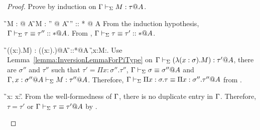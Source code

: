 \begin{proof}
    Prove by induction on \( \Gamma \vdash_\Sigma M : \tau @ A \).
    \begin{rneqncase}{\TConv}{
            \G \V M : \tau @ A 
            \G \V M : \tau'' @ A  \G \V \tau \E \tau'' :: * @ A
        }
        From the induction hypothesis, \( \Gamma \vdash_\Sigma \tau \equiv \tau'' :: * @ A \). From \QTrans, \( \Gamma \vdash_\Sigma \tau \equiv \tau' :: * @ A \).
    \end{rneqncase}
    \begin{rneqncase}{\TAbs}{
            \G \V (\lambda (x:\sigma).M) : (\Pi (x:\sigma).\tau)@A 
            \G\V \sigma::*@A 
            \G,x:\sigma@A\V M:\tau@A.
        }
        Use Lemma~\ref{lemma:InversionLemmaForPiType} on \( \Gamma \vdash_\Sigma (\lambda
        (x:\sigma).M) : \tau' @ A \), there are \( \sigma'' \) and \( \tau'' \)
        such that \( \tau' = \Pi x:\sigma''.\tau'' \), \( \Gamma \vdash_\Sigma \sigma \equiv
        \sigma'' @ A \) and \( \Gamma, x:\sigma''@A \vdash_\Sigma M : \tau'' @ A \).
        Therefore, \( \Gamma \vdash_\Sigma \Pi x:\sigma.\tau \equiv \Pi x:\sigma''.\tau'' @ A \)
        from \QTAbs.
    \end{rneqncase}
    \begin{rneqncase}{\TVar}{
            \G \V x:\tau@A {}
            x:\tau@A \in \G.
        }
        From the well-formedness of \( \Gamma \), there is no duplicate entry in \(
        \Gamma \). Therefore, \( \tau = \tau' \) or \( \Gamma \vdash_\Sigma \tau \equiv \tau' @ A \)
        by \TConv.
    \end{rneqncase}
\end{proof}


